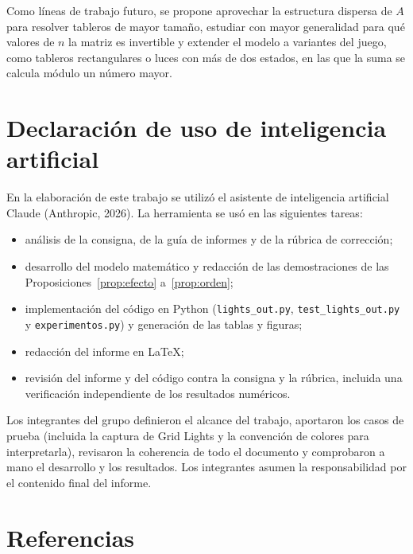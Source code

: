 \documentclass[12pt,a4paper]{article}
\theoremstyle{plain}
\theoremstyle{definition}
\theoremstyle{remark}
\newcommand{\codigo}[1]{\texttt{#1}}
\begin{document}
Como líneas de trabajo futuro, se propone aprovechar la estructura dispersa de $A$ para resolver tableros de mayor tamaño, estudiar con mayor generalidad para qué valores de $n$ la matriz es invertible y extender el modelo a variantes del juego, como tableros rectangulares o luces con más de dos estados, en las que la suma se calcula módulo un número mayor.

\section*{Declaración de uso de inteligencia artificial}

En la elaboración de este trabajo se utilizó el asistente de inteligencia artificial Claude (Anthropic, 2026). La herramienta se usó en las siguientes tareas:
\begin{itemize}[leftmargin=2em,itemsep=0pt]
  \item análisis de la consigna, de la guía de informes y de la rúbrica de corrección;
  \item desarrollo del modelo matemático y redacción de las demostraciones de las Proposiciones~\ref{prop:efecto} a~\ref{prop:orden};
  \item implementación del código en Python (\codigo{lights\_out.py}, \codigo{test\_lights\_out.py} y \codigo{experimentos.py}) y generación de las tablas y figuras;
  \item redacción del informe en \LaTeX{};
  \item revisión del informe y del código contra la consigna y la rúbrica, incluida una verificación independiente de los resultados numéricos.
\end{itemize}

Los integrantes del grupo definieron el alcance del trabajo, aportaron los casos de prueba (incluida la captura de Grid Lights y la convención de colores para interpretarla), revisaron la coherencia de todo el documento y comprobaron a mano el desarrollo y los resultados. Los integrantes asumen la responsabilidad por el contenido final del informe.

\section*{Referencias}
\end{document}

